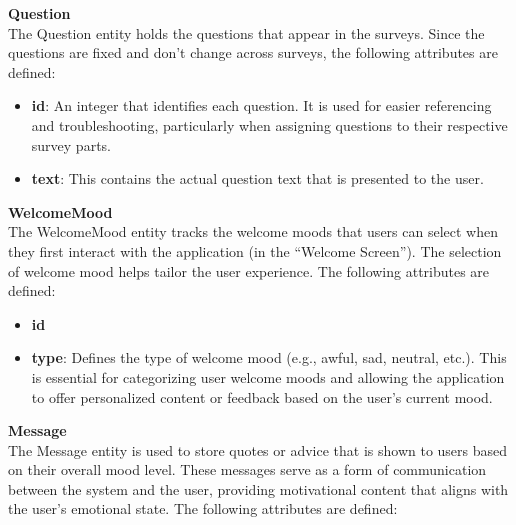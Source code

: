\vspace{5mm}

\noindent \textbf{Question} \\
The Question entity holds the questions that appear in the surveys. Since the questions are fixed and don't change across surveys, the following attributes are defined:

\begin{itemize}
    \item \textbf{id}: An integer that identifies each question. It is used for easier referencing and troubleshooting, particularly when assigning questions to their respective survey parts.
    \item \textbf{text}: This contains the actual question text that is presented to the user.
\end{itemize}

\vspace{5mm}

\noindent \textbf{WelcomeMood} \\
The WelcomeMood entity tracks the welcome moods that users can select when they first interact with the application (in the ``Welcome Screen''). The selection of welcome mood helps tailor the user experience. The following attributes are defined:

\begin{itemize}
    \item \textbf{id}
    \item \textbf{type}: Defines the type of welcome mood (e.g., awful, sad, neutral, etc.). This is essential for categorizing user welcome moods and allowing the application to offer personalized content or feedback based on the user's current mood.
\end{itemize}

\vspace{5mm}

\noindent \textbf{Message} \\
The Message entity is used to store quotes or advice that is shown to users based on their overall mood level. These messages serve as a form of communication between the system and the user, providing motivational content that aligns with the user's emotional state. The following attributes are defined:

